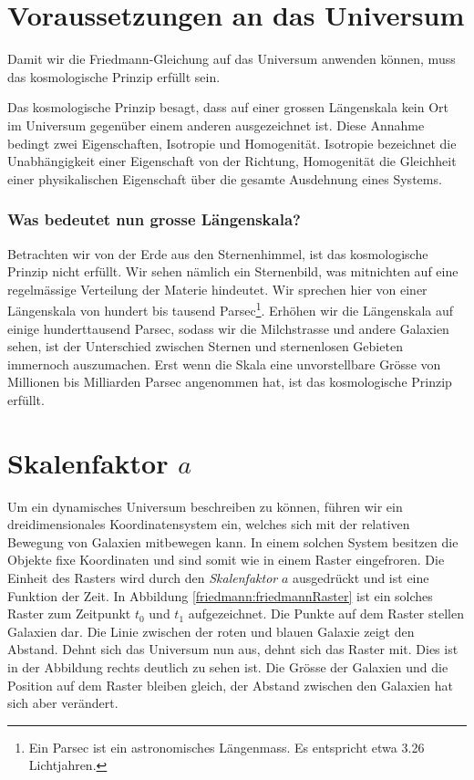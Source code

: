 \begin{refsection}
\section{Voraussetzungen an das Universum}
Damit wir die Friedmann-Gleichung auf das Universum anwenden können, muss das kosmologische Prinzip erfüllt sein. 
\begin{satz}
	\label{Prinzip:kosmologisches Prinzip}
%
%
	Das kosmologische Prinzip besagt, dass auf einer grossen Längenskala kein Ort im Universum gegenüber einem anderen ausgezeichnet ist. Diese Annahme bedingt zwei Eigenschaften, Isotropie und Homogenität. Isotropie  bezeichnet die Unabhängigkeit einer Eigenschaft von der Richtung, Homogenität die Gleichheit einer physikalischen Eigenschaft über die gesamte Ausdehnung eines Systems.
\end{satz}

\subsubsection*{Was bedeutet nun grosse Längenskala?}
Betrachten wir von der Erde aus den Sternenhimmel, ist das kosmologische Prinzip nicht erfüllt. Wir sehen nämlich ein Sternenbild, was mitnichten auf eine regelmässige Verteilung der Materie hindeutet. Wir sprechen hier von einer Längenskala von hundert bis tausend Parsec\footnote{Ein Parsec ist ein astronomisches Längenmass. Es entspricht etwa 3.26 Lichtjahren.}. Erhöhen wir die Längenskala auf einige hunderttausend Parsec, sodass wir die Milchstrasse und andere Galaxien sehen, ist der Unterschied zwischen Sternen und sternenlosen Gebieten immernoch auszumachen. Erst wenn die Skala eine unvorstellbare Grösse von Millionen bis Milliarden Parsec angenommen hat, ist das kosmologische Prinzip erfüllt. 

\section{Skalenfaktor $a$\label{Section:Skalenfaktor}}
Um ein dynamisches Universum beschreiben zu können, führen wir ein dreidimensionales Koordinatensystem ein, welches sich mit der relativen Bewegung von Galaxien mitbewegen kann. In einem solchen System besitzen die Objekte fixe Koordinaten und sind somit wie in einem Raster eingefroren. Die Einheit des Rasters wird durch den {\em Skalenfaktor} $a$ ausgedrückt und ist eine Funktion der Zeit. In Abbildung \ref{friedmann:friedmannRaster} ist ein solches Raster zum Zeitpunkt $t_0$ und $t_1$ aufgezeichnet. Die Punkte auf dem Raster stellen Galaxien dar. Die Linie zwischen der roten und blauen Galaxie zeigt den Abstand. Dehnt sich das Universum nun aus, dehnt sich das Raster mit. Dies ist in der Abbildung rechts deutlich zu sehen ist. Die Grösse der Galaxien und die Position auf dem Raster bleiben gleich, der Abstand zwischen den Galaxien hat sich aber verändert. 


\end{refsection}
